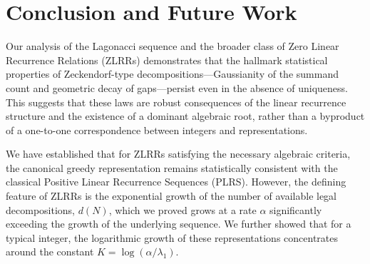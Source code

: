 \documentclass[11pt]{amsart}
\theoremstyle{plain}
\numberwithin{equation}{section} %
\numberwithin{table}{section} %
\numberwithin{figure}{section}
\begin{document}
	
	\section{Conclusion and Future Work}
	Our analysis of the Lagonacci sequence and the broader class of Zero Linear Recurrence Relations (ZLRRs) demonstrates that the hallmark statistical properties of Zeckendorf-type decompositions—Gaussianity of the summand count and geometric decay of gaps—persist even in the absence of uniqueness. This suggests that these laws are robust consequences of the linear recurrence structure and the existence of a dominant algebraic root, rather than a byproduct of a one-to-one correspondence between integers and representations.
	
	We have established that for ZLRRs satisfying the necessary algebraic criteria, the canonical greedy representation remains statistically consistent with the classical Positive Linear Recurrence Sequences (PLRS). However, the defining feature of ZLRRs is the exponential growth of the number of available legal decompositions, $d(N)$, which we proved grows at a rate $\alpha$ significantly exceeding the growth of the underlying sequence. We further showed that for a typical integer, the logarithmic growth of these representations concentrates around the constant $K = \log(\alpha/\lambda_1)$.
	
\end{document}
